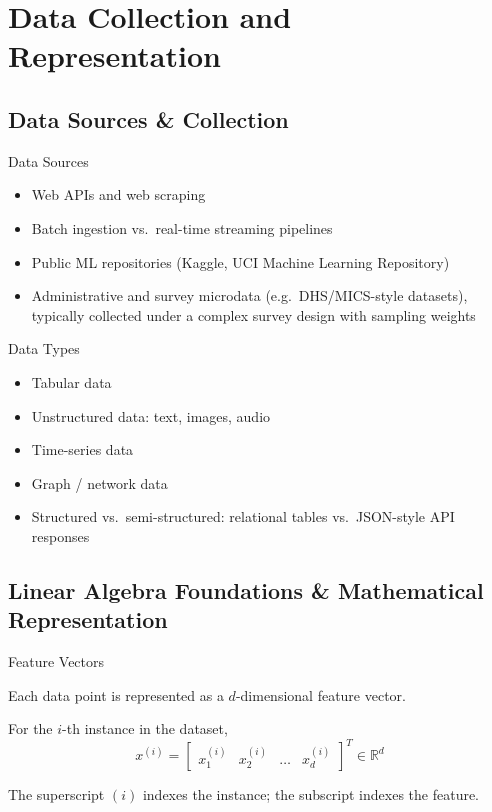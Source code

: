 \section{Data Collection and Representation}
\subsection{Data Sources \& Collection}

\begin{frame}{Data Sources}
    \begin{itemize}
        \item Web APIs and web scraping
        \item Batch ingestion vs.\ real-time streaming pipelines
        \item Public ML repositories (Kaggle, UCI Machine Learning Repository)
        \item Administrative and survey microdata (e.g.\ DHS/MICS-style datasets), typically collected under a complex survey design with sampling weights
    \end{itemize}
\end{frame}


\begin{frame}{Data Types}
    \begin{itemize}
        \item Tabular data
        \item Unstructured data: text, images, audio
        \item Time-series data
        \item Graph / network data
        \item Structured vs.\ semi-structured: relational tables vs.\ JSON-style API responses
    \end{itemize}
\end{frame}


\subsection{Linear Algebra Foundations \& Mathematical Representation}


\begin{frame}{Feature Vectors}
    \begin{sitemize}
        \item Each data point is represented as a $d$-dimensional feature vector.
        \item For the $i$-th instance in the dataset,
        $$x^{(i)} = \begin{bmatrix} x^{(i)}_1 & x^{(i)}_2 & \dots & x^{(i)}_d \end{bmatrix}^T \in \mathbb{R}^d$$
        \item The superscript $(i)$ indexes the instance; the subscript indexes the feature.
    \end{sitemize}
\end{frame}


